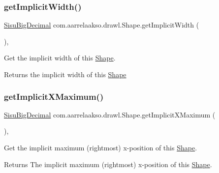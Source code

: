 \subsubsection{\texorpdfstring{get\+Implicit\+Width()}{getImplicitWidth()}}
{\footnotesize\ttfamily \hyperlink{classcom_1_1aarrelaakso_1_1drawl_1_1_sisu_big_decimal}{Sisu\+Big\+Decimal} com.\+aarrelaakso.\+drawl.\+Shape.\+get\+Implicit\+Width (\begin{DoxyParamCaption}{ }\end{DoxyParamCaption})\hspace{0.3cm}{\ttfamily [protected]}, {\ttfamily [inherited]}}



Get the implicit width of this \hyperlink{classcom_1_1aarrelaakso_1_1drawl_1_1_shape}{Shape}. 

\begin{DoxyReturn}{Returns}
the implicit width of this \hyperlink{classcom_1_1aarrelaakso_1_1drawl_1_1_shape}{Shape} 
\end{DoxyReturn}
\mbox{\label{classcom_1_1aarrelaakso_1_1drawl_1_1_shape_a3bde9d5b2cc582ddb6c521b122c40ff8}} 
\subsubsection{\texorpdfstring{get\+Implicit\+X\+Maximum()}{getImplicitXMaximum()}}
{\footnotesize\ttfamily \hyperlink{classcom_1_1aarrelaakso_1_1drawl_1_1_sisu_big_decimal}{Sisu\+Big\+Decimal} com.\+aarrelaakso.\+drawl.\+Shape.\+get\+Implicit\+X\+Maximum (\begin{DoxyParamCaption}{ }\end{DoxyParamCaption})\hspace{0.3cm}{\ttfamily [protected]}, {\ttfamily [inherited]}}



Get the implicit maximum (rightmost) x-\/position of this \hyperlink{classcom_1_1aarrelaakso_1_1drawl_1_1_shape}{Shape}. 

\begin{DoxyReturn}{Returns}
The implicit maximum (rightmost) x-\/position of this \hyperlink{classcom_1_1aarrelaakso_1_1drawl_1_1_shape}{Shape}. 
\end{DoxyReturn}
\mbox{\label{classcom_1_1aarrelaakso_1_1drawl_1_1_shape_af0ceac29118047c73bd3ff308a71c36f}} 
